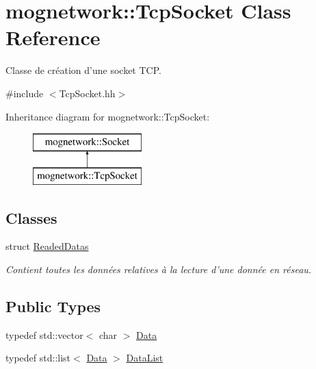 \hypertarget{classmognetwork_1_1_tcp_socket}{\section{mognetwork\-:\-:Tcp\-Socket Class Reference}
\label{classmognetwork_1_1_tcp_socket}
}


Classe de création d'une socket T\-C\-P.  




{\ttfamily \#include $<$Tcp\-Socket.\-hh$>$}

Inheritance diagram for mognetwork\-:\-:Tcp\-Socket\-:\begin{figure}[H]
\begin{center}
\leavevmode
\includegraphics[height=2.000000cm]{classmognetwork_1_1_tcp_socket}
\end{center}
\end{figure}
\subsection*{Classes}
\begin{DoxyCompactItemize}
\item 
struct \hyperlink{structmognetwork_1_1_tcp_socket_1_1_readed_datas}{Readed\-Datas}
\begin{DoxyCompactList}\small\item\em Contient toutes les données relatives à la lecture d'une donnée en réseau. \end{DoxyCompactList}\end{DoxyCompactItemize}
\subsection*{Public Types}
\begin{DoxyCompactItemize}
\item 
typedef std\-::vector$<$ char $>$ \hyperlink{classmognetwork_1_1_tcp_socket_aa80d910649a16cedb6c98297e5893ed1}{Data}
\item 
typedef std\-::list$<$ \hyperlink{classmognetwork_1_1_tcp_socket_aa80d910649a16cedb6c98297e5893ed1}{Data} $>$ \hyperlink{classmognetwork_1_1_tcp_socket_ad7bb1f8749cfba5e4b181b035b0659c1}{Data\-List}
\end{DoxyCompactItemize}
